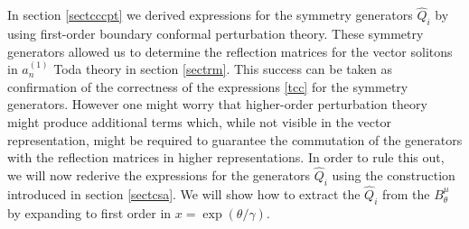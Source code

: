 \documentclass[a4paper,12pt]{article}
\numberwithin{equation}{section}
\begin{document}
In section \ref{sectcccpt} we derived expressions for the symmetry
generators $\hat{Q}_i$ by using first-order boundary conformal
perturbation theory. These symmetry generators allowed us to
determine the reflection matrices for the vector solitons in
$a_n^{(1)}$ Toda theory in section \ref{sectrm}. This success can
be taken as confirmation of the correctness of the expressions
\eqref{tcc} for the symmetry generators. However one might worry
that higher-order perturbation theory might produce additional
terms which, while not visible in the vector representation, might
be required to guarantee the commutation of the generators with
the reflection matrices in higher representations. In order to
rule this out, we will now rederive the expressions for the
generators $\hat{Q}_i$ using the construction introduced in
section \ref{sectcsa}. We will show how to extract the $\hat{Q}_i$
from the $B^\mu_\theta$ by expanding to first order in
$x=\exp(\theta/\gamma)$.
\end{document}
